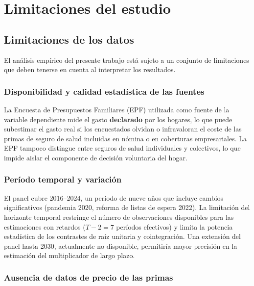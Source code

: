 \chapter{Limitaciones del estudio}
\label{cap:limitaciones}

\section{Limitaciones de los datos}

El análisis empírico del presente trabajo está sujeto a un conjunto de
limitaciones que deben tenerse en cuenta al interpretar los resultados.

\subsection{Disponibilidad y calidad estadística de las fuentes}

La Encuesta de Presupuestos Familiares (EPF) utilizada como fuente de la variable
dependiente mide el gasto \textbf{declarado} por los hogares, lo que puede
subestimar el gasto real si los encuestados olvidan o infravaloran el coste de las
primas de seguro de salud incluidas en nómina o en coberturas empresariales. La
EPF tampoco distingue entre seguros de salud individuales y colectivos, lo que
impide aislar el componente de decisión voluntaria del hogar.

\subsection{Período temporal y variación}

El panel cubre 2016--2024, un período de nueve años que incluye cambios
significativos (pandemia 2020, reforma de listas de espera 2022). La limitación del
horizonte temporal restringe el número de observaciones disponibles para las
estimaciones con retardos ($T-2 = 7$ períodos efectivos) y limita la potencia
estadística de los contrastes de raíz unitaria y cointegración. Una extensión del
panel hasta 2030, actualmente no disponible, permitiría mayor precisión en la
estimación del multiplicador de largo plazo.

\subsection{Ausencia de datos de precio de las primas}

